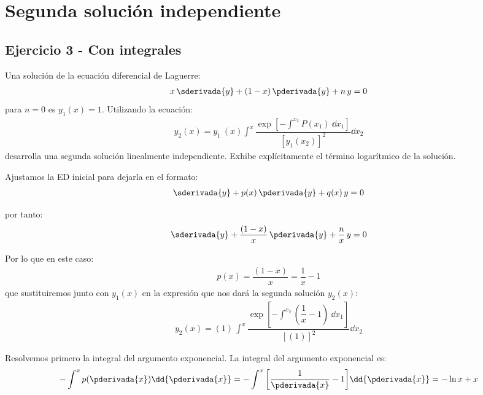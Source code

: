 \section{Segunda solución independiente}

\subsection{Ejercicio 3 - Con integrales}

\begin{ejemplo}
Una solución de la ecuación diferencial de Laguerre:
\begin{align*}
x \, \sderivada{y} + (1 - x) \, \pderivada{y} + n \, y = 0
\end{align*}
para $n = 0$ es $y_{1}(x) = 1$. Utilizando la ecuación:
\begin{align*}
y_{2}(x) =  y_{1} \: (x) \int^{x} \dfrac{\exp \left[ \displaystyle - \int^{x_{2}} P(x_{1}) \: \dd{x_{1}} \right]}{[y_{1}(x_{2})]^{2}} \dd{x_{2}}
\end{align*}
desarrolla una segunda solución linealmente independiente. Exhibe explícitamente el término logarítmico de la solución.
\par
Ajustamos la ED inicial para dejarla en el formato:
\begin{align*}
\sderivada{y} + p(x) \, \pderivada{y} + q(x) \, y = 0
\end{align*}

por tanto:
\begin{align*}
\sderivada{y} + \dfrac{(1 - x)}{x} \, \pderivada{y} + \dfrac{n}{x} \, y = 0
\end{align*}

Por lo que en este caso:
\begin{align*}
p(x) = \dfrac{(1 - x)}{x} = \dfrac{1}{x} - 1
\end{align*}
que sustituiremos junto con $y_{1}(x)$ en la expresión que nos dará la segunda solución $y_{2}(x)$:
\begin{align*}
y_{2}(x) =  (1) \, \int^{x} \dfrac{\exp \left[ \displaystyle - \int^{x_{2}} \left( \dfrac{1}{x} - 1 \right) \: \dd{x_{1}} \right]}{[(1)]^{2}} \dd{x_{2}}
\end{align*}

Resolvemos primero la integral del argumento exponencial. La integral del argumento exponencial es:
\begin{align*}
- \int^{x} p(\pderivada{x}) \dd{\pderivada{x}} =  - \int^{x} \bigg[ \dfrac{1}{\pderivada{x}} - 1 \bigg] \dd{\pderivada{x}}=  - \ln x + x
\end{align*}


\end{ejemplo}
